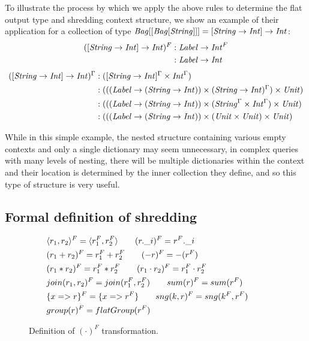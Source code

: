 {{{{To illustrate the process by which we apply the above rules to determine the flat output type and shredding context structure, we show an example of their application for a collection of type $\textrm{\textit{Bag}}[[\textrm{\textit{Bag}}[\textrm{\textit{String}}]]] = [\textrm{\textit{String}} \rightarrow \textrm{\textit{Int}}] \rightarrow \textrm{\textit{Int}}$:
\begin{equation*}
\begin{split}
([\textrm{\textit{String}} \rightarrow \textrm{\textit{Int}}] \rightarrow \textrm{\textit{Int}})^F&: \textrm{\textit{Label}} \rightarrow \textrm{\textit{Int}}^F \\
&: \textrm{\textit{Label}} \rightarrow \textrm{\textit{Int}}
\end{split}
\end{equation*}
\begin{equation*}
\begin{split}
([\textrm{\textit{String}} \rightarrow \textrm{\textit{Int}}] \rightarrow \textrm{\textit{Int}})^\Gamma&: ([\textrm{\textit{String}} \rightarrow \textrm{\textit{Int}}]^\Gamma \times \textrm{\textit{Int}}^\Gamma) \\
&: (((\textrm{\textit{Label}} \rightarrow (\textrm{\textit{String}} \rightarrow \textrm{\textit{Int}})) \times (\textrm{\textit{String}} \rightarrow \textrm{\textit{Int}})^\Gamma) \times \textrm{\textit{Unit}}) \\
&: (((\textrm{\textit{Label}} \rightarrow (\textrm{\textit{String}} \rightarrow \textrm{\textit{Int}})) \times (\textrm{\textit{String}}^\Gamma \times \textrm{\textit{Int}}^\Gamma) \times \textrm{\textit{Unit}}) \\
&: (((\textrm{\textit{Label}} \rightarrow (\textrm{\textit{String}} \rightarrow \textrm{\textit{Int}})) \times (\textrm{\textit{Unit}} \times \textrm{\textit{Unit}}) \times \textrm{\textit{Unit}}) \\
\end{split}
\end{equation*}

While in this simple example, the nested structure containing various empty contexts and only a single dictionary may seem unnecessary, in complex queries with many levels of nesting, there will be multiple dictionaries within the context and their location is determined by the inner collection they define, and so this type of structure is very useful.

}

\subsection{Formal definition of shredding}

\begin{figure}
\begin{equation*}
\begin{aligned}
&\langle r_1, r_2 \rangle^F = \langle r_1^F, r_2^F \rangle \qquad (r.\_i)^F = r^F.\_i \\
&(r_1 + r_2)^F = r_1^F + r_2^F \qquad (-r)^F = -(r^F) \\
&(r_1*r_2)^F = r_1^F * r_2^F \qquad (r_1 \cdot r_2)^F = r_1^F \cdot r_2^F  \\
&join(r_1,r_2)^F = join(r_1^F,r_2^F) \qquad sum(r)^F = sum(r^F) \\
&\{x => r\}^F = \{x => r^F \} \qquad sng(k,r)^F = sng(k^F,r^F) \\
&group(r)^F = flatGroup(r^F) \\
\end{aligned}
\qquad
\end{equation*}
\caption{Definition of $(\cdot)^F$ transformation.}
\label{flatdef}
\end{figure}

}}}
